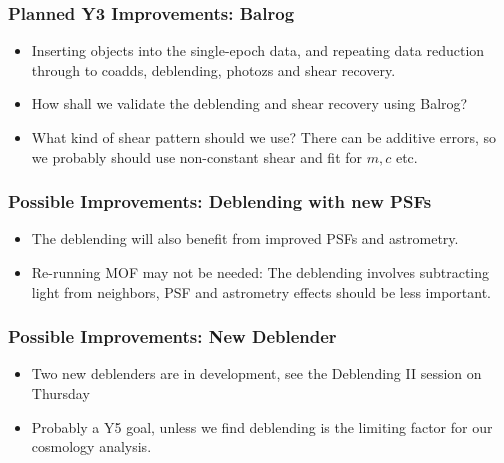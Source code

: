 \documentclass{beamer}
\begin{document}
\frame
{
    \frametitle{Planned Y3 Improvements: Balrog}

    \begin{itemize}

        \item Inserting objects into the single-epoch data, and
            repeating data reduction through to coadds, 
            deblending, photozs and shear recovery.

        \item How shall we validate the deblending and shear recovery
            using Balrog?

        \item What kind of shear pattern should we use?  There can be
            additive errors, so we probably should use non-constant
            shear and fit for $m, c$ etc.


    \end{itemize}

}


\frame
{
    \frametitle{Possible Improvements: Deblending with new PSFs}

    \begin{itemize}

        \item The deblending will also benefit from improved
            PSFs and astrometry.

        \item Re-running MOF may not be needed: The deblending involves
            subtracting light from neighbors, PSF and astrometry effects should
            be less important.

    \end{itemize}

}

\frame
{
    \frametitle{Possible Improvements: New Deblender}

    \begin{itemize}

        \item Two new deblenders are in development, see 
            the Deblending II session on Thursday

        \item Probably a Y5 goal, unless we find deblending is
            the limiting factor for our cosmology analysis.

    \end{itemize}

}
\end{document}
